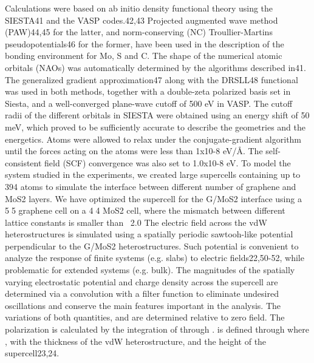 Calculations were based on ab initio density functional theory using the SIESTA41 and the VASP codes.42,43 Projected augmented wave method (PAW)44,45 for the latter, and norm-conserving (NC) Troullier-Martins pseudopotentials46 for the former, have been used in the description of the bonding environment for Mo, S and C. The shape of the numerical atomic orbitals (NAOs) was automatically determined by the algorithms described in41. The generalized gradient approximation47 along with the DRSLL48 functional was used in both methods, together with a double-zeta polarized basis set in Siesta, and a well-converged plane-wave cutoff of 500 eV in VASP. The cutoff radii of the different orbitals in SIESTA were obtained using an energy shift of 50 meV, which proved to be sufficiently accurate to describe the geometries and the energetics. Atoms were allowed to relax under the conjugate-gradient algorithm until the forces acting on the atoms were less than 1x10-8 eV/Å. The self-consistent field (SCF) convergence was also set to 1.0x10-8 eV. To model the system studied in the experiments, we created large supercells containing up to 394 atoms to simulate the interface between different number of graphene and MoS2 layers. We have optimized the supercell for the G/MoS2 interface using a 55 graphene cell on a 44 MoS2 cell, where the mismatch between different lattice constants is smaller than ~2.0%
The electric field   across the vdW heterostructures is simulated using a spatially periodic sawtooh-like potential   perpendicular to the G/MoS2 heterostructures. Such potential is convenient to analyze the response of finite systems (e.g. slabs) to electric fields22,50-52, while problematic for extended systems (e.g. bulk).  The magnitudes of the spatially varying electrostatic potential and charge density   across the supercell are determined via a convolution with a filter function to eliminate undesired oscillations and conserve the main features important in the analysis. The variations of both quantities,  and  are determined relative to zero field. The polarization   is calculated by the integration of   through  .   is defined through   where   , with   the thickness of the vdW heterostructure, and    the height of the supercell23,24.  

